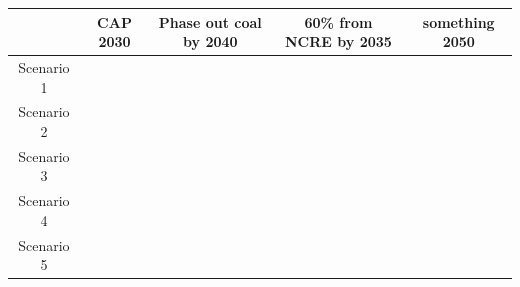 \documentclass[11pt, letterpaper]{article}
\newcommand{\xmark}{\ding{55}}%
\begin{document}
\begin{center}
 \begin{tabular}{ |c|c|c|c|c|  }
 \hline
 & CAP 2030 & Phase out coal by 2040 & 60\% from NCRE by 2035 & something 2050 \\ [0.5ex] 
 \hline\hline
Scenario 1 &  &    & &\\ 
 \hline
Scenario 2 & \xmark  &  &  &\\
 \hline
 Scenario 3 &  & \xmark & \xmark&\\
 \hline
 Scenario 4 &\xmark  &  &\xmark &\xmark\\
 \hline
Scenario 5 &\xmark  & \xmark & \xmark&\xmark\\ [1ex] 
 \hline
\end{tabular}
\end{center}
\end{document}
